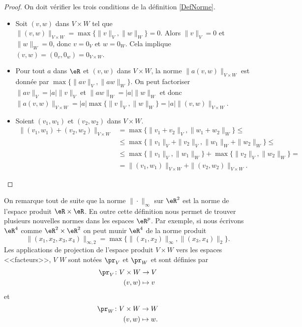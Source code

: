 \begin{proof}
	On doit vérifier les trois conditions de la définition \ref{DefNorme}.
	\begin{itemize}
		\item Soit $(v,w)$ dans $V\times W$ tel que $\|(v,w)\|_{V\times W}=\max\{\|v\|_{V},\|w\|_W\}=0$. Alors $\|v\|_V=0$ et $\|w\|_W=0$, donc $v=0_V$ et $w=0_W$. Cela implique $(v,w)=(0_v,0_w)=0_{V\times W}$. 
		\item Pour tout $a$ dans $\eR$ et $(v,w)$ dans $V\times W$,  la norme $\|a (v,w)\|_{V\times W}$ est donnée par  $\max\{\|av\|_{V},\|aw\|_W\}$. On peut factoriser $\|av\|_{V}=|a|\|v\|_{V}$ et $\|aw\|_W=|a|\|w\|_W$ et donc $\|a (v,w)\|_{V\times W}=|a|\max\{\|v\|_{V},\|w\|_W\}=|a|\|(v,w)\|_{V\times W}$.
		\item Soient $(v_1,w_1)$ et $(v_2,w_2)$ dans $V\times W$. 
		\begin{equation}
			\begin{aligned}
				\|(v_1,w_1)+(v_2,w_2)\|_{V\times W}&=\max\{\|v_1+v_2\|_{V},\|w_1+w_2\|_W\}\leq\\
				&\leq \max\{\|v_1\|_V+\|v_2\|_{V},\|w_1\|_W+\|w_2\|_W\}\leq\\
				&\leq\max\{\|v_1\|_V,\|w_1\|_W\}+ \max\{\|v_2\|_{V},\|w_2\|_W\}=\\
				&=\|(v_1,w_1)\|_{V\times W}+\|(v_2,w_2)\|_{V\times W}.
			\end{aligned}
		\end{equation}
	\end{itemize} 
\end{proof}
On remarque tout de suite que la norme $\|\cdot\|_\infty$ sur $\eR^2$ est la norme de l'espace produit $\eR\times\eR$. En outre cette définition nous permet de trouver plusieurs nouvelles normes dans les espaces $\eR^p$. Par exemple, si nous écrivons $\eR^4$ comme $\eR^2\times \eR^2$ on peut munir $\eR^4$ de la norme produit
\[
\|(x_1,x_2,x_3,x_4)\|_{\infty, 2}=\max\{\|(x_1,x_2)\|_\infty, \|(x_3,x_4)\|_2\}. 
\]    
Les applications de projection de l'espace produit $V\times W$ vers les espaces <<facteurs>>, $V$ $W$ sont notées $\pr_V$ et $\pr_W$ et sont définies par
\begin{equation}
	\begin{aligned}
		\pr_V\colon V\times W&\to V \\
		(v,w)&\mapsto v 
	\end{aligned}
\end{equation}
et
\begin{equation}
	\begin{aligned}
		\pr_W\colon V\times W &\to W \\
		(v,w)&\mapsto w. 
	\end{aligned}
\end{equation}
